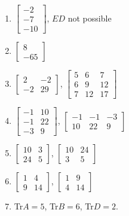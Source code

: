 \begin{multicols}{2}
\begin{enumerate}
\begin{enumerate}
	\item 
	$
\begin{bmatrix}
 -2 \\
 -7 \\
 -10
\end{bmatrix}
$, $ED$ not possible
	\item $
\begin{bmatrix}
 8 \\
 -65
\end{bmatrix}
$
	\item 
$\begin{bmatrix}
 2 & -2 \\
 -2 & 29
\end{bmatrix}$, 
$
\begin{bmatrix}
 5 & 6 & 7 \\
 6 & 9 & 12 \\
 7 & 12 & 17
\end{bmatrix}
$
	\item 
$\begin{bmatrix}
 -1 & 10 \\
 -1 & 22 \\
 -3 & 9
\end{bmatrix}
$, $
\begin{bmatrix}
 -1 & -1 & -3 \\
 10 & 22 & 9
\end{bmatrix}
$	\item 
$\begin{bmatrix}
 10 & 3 \\
 24 & 5
\end{bmatrix}
$, $
\begin{bmatrix}
 10 & 24 \\
 3 & 5
\end{bmatrix}
$	
\item 
$\begin{bmatrix}
 1 & 4 \\
 9 & 14
\end{bmatrix}
$, $
\begin{bmatrix}
 1 & 9 \\
 4 & 14
\end{bmatrix}
$	\item  Tr$A=5$, Tr$B=6$, Tr$D=2$.	
\end{enumerate}








\end{enumerate}
\end{multicols}
